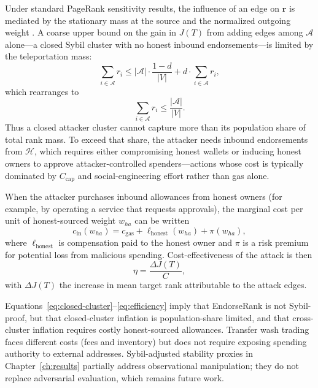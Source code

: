Under standard PageRank sensitivity results, the influence of an edge on $\mathbf{r}$ is mediated by the stationary mass at the source and the normalized outgoing weight . A coarse upper bound on the gain in $J(T)$ from adding edges among $\mathcal{A}$ alone---a closed Sybil cluster with no honest inbound endorsements---is limited by the teleportation mass:
\begin{equation}
\label{eq:closed-cluster}
\sum_{i\in\mathcal{A}} r_i \leq |\mathcal{A}|\cdot\frac{1-d}{|V|} + d\cdot \sum_{i\in\mathcal{A}} r_i,
\end{equation}
which rearranges to
\begin{equation}
\label{eq:cluster-mass}
\sum_{i\in\mathcal{A}} r_i \leq \frac{|\mathcal{A}|}{|V|}.
\end{equation}
Thus a closed attacker cluster cannot capture more than its population share of total rank mass. To exceed that share, the attacker needs inbound endorsements from $\mathcal{H}$, which requires either compromising honest wallets or inducing honest owners to approve attacker-controlled spenders---actions whose cost is typically dominated by $C_{\mathrm{cap}}$ and social-engineering effort rather than gas alone.

When the attacker purchases inbound allowances from honest owners (for example, by operating a service that requests approvals), the marginal cost per unit of honest-sourced weight $w_{h a}$ can be written
\begin{equation}
\label{eq:marginal}
c_{\mathrm{in}}(w_{h a}) = c_{\mathrm{gas}} + \ell_{\mathrm{honest}}(w_{h a}) + \pi(w_{h a}),
\end{equation}
where $\ell_{\mathrm{honest}}$ is compensation paid to the honest owner and $\pi$ is a risk premium for potential loss from malicious spending. Cost-effectiveness of the attack is then
\begin{equation}
\label{eq:efficiency}
\eta = \frac{\Delta J(T)}{C},
\end{equation}
with $\Delta J(T)$ the increase in mean target rank attributable to the attack edges.

Equations~\eqref{eq:closed-cluster}--\eqref{eq:efficiency} imply that EndorseRank is not Sybil-proof, but that closed-cluster inflation is population-share limited, and that cross-cluster inflation requires costly honest-sourced allowances. Transfer wash trading faces different costs (fees and inventory) but does not require exposing spending authority to external addresses. Sybil-adjusted stability proxies in Chapter~\ref{ch:results} partially address observational manipulation; they do not replace adversarial evaluation, which remains future work.

